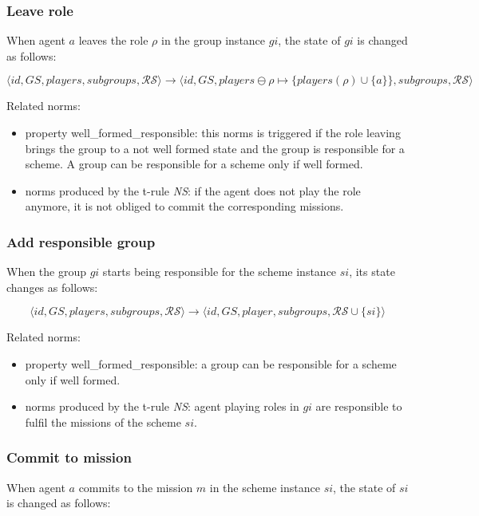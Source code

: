 \documentclass{article}
\newcommand{\set}[1]{\mathcal{#1}}
\newcommand{\rwlabel}[1]{{\scshape\itshape\textrm{#1}}}
\theoremstyle{definition} \newtheorem{definition}{Definition}
\begin{document}
\subsubsection{Leave role}

When agent $a$ leaves the role $\rho$ in the group instance $gi$, the
state of $gi$ is changed as follows:

\[
\langle id, GS, players, subgroups, \set{RS} \rangle  \longrightarrow
\langle id, GS, players \ominus \rho \mapsto \{ players(\rho) \cup \{a\} \}, subgroups, \set{RS} \rangle
\]

Related norms:
\begin{itemize}
\item property well\_formed\_responsible: this norms is triggered if
  the role leaving brings the group to a not well formed state and the
  group is responsible for a scheme. A group can be responsible for a
  scheme only if well formed.
\item norms produced by the t-rule \rwlabel{NS}: if the agent does not
  play the role anymore, it is not obliged to commit the corresponding
  missions.
\end{itemize}

\subsubsection{Add responsible group}

When the group $gi$ starts being responsible for the scheme instance
$si$, its state changes as follows:

\[
\langle id, GS, players, subgroups, \set{RS} \rangle  \longrightarrow
\langle id, GS, player, subgroups, \set{RS} \cup \{ si \} \rangle
\]

Related norms:
\begin{itemize}
\item property well\_formed\_responsible: a group can be responsible
  for a scheme only if well formed.
\item norms produced by the t-rule \rwlabel{NS}: agent playing roles
  in $gi$ are responsible to fulfil the missions of the scheme $si$.
\end{itemize}

\subsubsection{Commit to mission}

When agent $a$ commits to the mission $m$ in the scheme instance $si$, the
state of $si$ is changed as follows:
\end{document}
